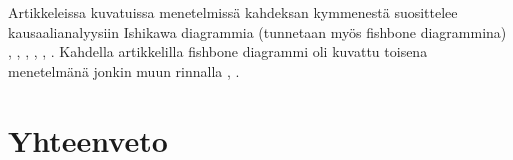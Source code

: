 Artikkeleissa kuvatuissa menetelmissä kahdeksan kymmenestä suosittelee kausaalianalyysiin Ishikawa diagrammia (tunnetaan myös fishbone diagrammina) \citep{kalinowski2012evidence}, \citep{de2004learning}, \citep{staalhane2004root}, \citep{dingsoyr2003extending}, \citep{birk2002postmortem}, \citep{card1998learning}. Kahdella artikkelilla fishbone diagrammi oli kuvattu toisena menetelmänä jonkin muun rinnalla \citep{Bjornson2009}, \citep{staalhane2003post}.

\section{Yhteenveto}
